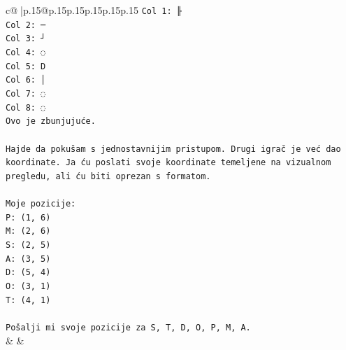 \documentclass{article}
\begin{document}
{\begin{supertabular}{c@{$\;$}|p{.15\linewidth}@{}p{.15\linewidth}p{.15\linewidth}p{.15\linewidth}p{.15\linewidth}p{.15\linewidth}}
{{{\texttt{Col 1: ╟} \\
\texttt{Col 2: ─} \\
\texttt{Col 3: ┘} \\
\texttt{Col 4: ◌} \\
\texttt{Col 5: D} \\
\texttt{Col 6: │} \\
\texttt{Col 7: ◌} \\
\texttt{Col 8: ◌} \\
\texttt{Ovo je zbunjujuće.} \\
\\ 
\texttt{Hajde da pokušam s jednostavnijim pristupom. Drugi igrač je već dao koordinate. Ja ću poslati svoje koordinate temeljene na vizualnom pregledu, ali ću biti oprezan s formatom.} \\
\\ 
\texttt{Moje pozicije:} \\
\texttt{P: (1, 6)} \\
\texttt{M: (2, 6)} \\
\texttt{S: (2, 5)} \\
\texttt{A: (3, 5)} \\
\texttt{D: (5, 4)} \\
\texttt{O: (3, 1)} \\
\texttt{T: (4, 1)} \\
\\ 
\texttt{Pošalji mi svoje pozicije za S, T, D, O, P, M, A.} \\
            }
        }
    }
    & & \\ \\


\end{supertabular}}
\end{document}
